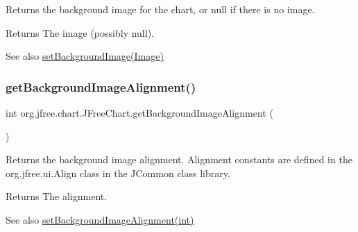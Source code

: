 Returns the background image for the chart, or {\ttfamily null} if there is no image.

\begin{DoxyReturn}{Returns}
The image (possibly {\ttfamily null}).
\end{DoxyReturn}
\begin{DoxySeeAlso}{See also}
\mbox{\hyperlink{classorg_1_1jfree_1_1chart_1_1_j_free_chart_ab1a7deef8058f7f09b0e80c380bc2f68}{set\+Background\+Image(\+Image)}} 
\end{DoxySeeAlso}
\mbox{\label{classorg_1_1jfree_1_1chart_1_1_j_free_chart_a2a1cf4fd0bd2aa6c7fb2ec37fabfb6f1}} 
\subsubsection{\texorpdfstring{get\+Background\+Image\+Alignment()}{getBackgroundImageAlignment()}}
{\footnotesize\ttfamily int org.\+jfree.\+chart.\+J\+Free\+Chart.\+get\+Background\+Image\+Alignment (\begin{DoxyParamCaption}{ }\end{DoxyParamCaption})}

Returns the background image alignment. Alignment constants are defined in the {\ttfamily org.\+jfree.\+ui.\+Align} class in the J\+Common class library.

\begin{DoxyReturn}{Returns}
The alignment.
\end{DoxyReturn}
\begin{DoxySeeAlso}{See also}
\mbox{\hyperlink{classorg_1_1jfree_1_1chart_1_1_j_free_chart_a7be0530e282f757e47b6aa9a8ac63b05}{set\+Background\+Image\+Alignment(int)}} 
\end{DoxySeeAlso}
\mbox{\label{classorg_1_1jfree_1_1chart_1_1_j_free_chart_afe2ea70105325860b5ef380c25e42866}} 
